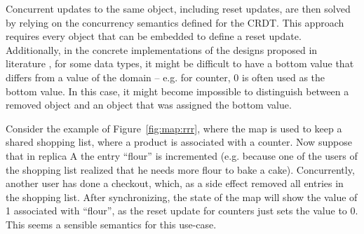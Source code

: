 \documentclass[11pt,a4paper]{article}
\begin{document}
Concurrent updates to the same object, including reset updates, are 
then solved by relying on the concurrency semantics defined for the CRDT.
This approach requires every object that can be embedded to define a reset 
update.
Additionally, in the concrete implementations 
of the designs proposed in literature \cite{Brown14Riak,DBLP:journals/jpdc/AlmeidaSB18}, 
for some data types, it might be difficult to have a bottom value that differs
from a value of the domain -- e.g. for counter, 0 is often used as the bottom value.
In this case, it might become impossible to distinguish between a removed object 
and an object that was assigned the bottom value.

Consider the example of Figure~\ref{fig:map:rrr}, where the map is used to 
keep a shared shopping list, where a product is associated with a counter.
Now suppose that in replica A the entry ``flour'' is incremented (e.g. because one 
of the users of the shopping list realized that he needs more flour to bake a cake).
Concurrently, another user has done a checkout, which, as a side effect removed all
entries in the shopping list.
After synchronizing, the state of the map will show the value of 1 associated with 
``flour'', as the reset update for counters just sets the value to 0. 
This seems a sensible semantics for this use-case.

\end{document}
